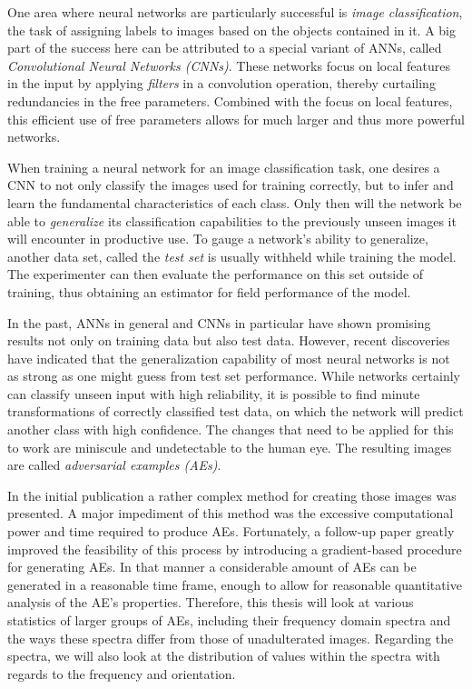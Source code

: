 \documentclass[11pt, a4paper]{article}
\begin{document}
One area where neural networks are particularly successful is \emph{image classification}, the task of assigning labels to images based on the objects contained in it. A big part of the success here can be attributed to a special variant of ANNs, called \emph{Convolutional Neural Networks (CNNs)}. These networks focus on local features in the input by applying \emph{filters} in a convolution operation, thereby curtailing redundancies in the free parameters. Combined with the focus on local features, this efficient use of free parameters allows for much larger and thus more powerful networks.

When training a neural network for an image classification task, one desires a CNN to not only classify the images used for training correctly, but to infer and learn the fundamental characteristics of each class. Only then will the network be able to \emph{generalize} its classification capabilities to the previously unseen images it will encounter in productive use. To gauge a network's ability to generalize, another data set, called the \emph{test set} is usually withheld while training the model. The experimenter can then evaluate the performance on this set outside of training, thus obtaining an estimator for field performance of the model.

In the past, ANNs in general and CNNs in particular have shown promising results not only on training data but also test data. However, recent discoveries have indicated that the generalization capability of most neural networks is not as strong as one might guess from test set performance. While networks certainly can classify unseen input with high reliability, it is possible to find minute transformations of correctly classified test data, on which the network will predict another class with high confidence. The changes that need to be applied for this to work are miniscule and undetectable to the human eye. The resulting images are called \emph{adversarial examples (AEs)}.

In the initial publication a rather complex method for creating those images was presented. A major impediment of this method was the excessive computational power and time required to produce AEs. Fortunately, a follow-up paper greatly improved the feasibility of this process by introducing a gradient-based procedure for generating AEs. In that manner a considerable amount of AEs can be generated in a reasonable time frame, enough to allow for reasonable quantitative analysis of the AE's properties. Therefore, this thesis will look at various statistics of larger groups of AEs, including their frequency domain spectra and the ways these spectra differ from those of unadulterated images. Regarding the spectra, we will also look at the distribution of values within the spectra with regards to the frequency and orientation.
\end{document}
